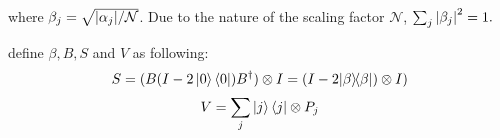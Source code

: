 \documentclass{article}
\def\kb#1#2{| #1 \rangle\!\langle #2 |}
\begin{document}
where $\beta_j = \sqrt{\abs{\alpha_j}/\mathcal{N}}$. Due to the nature of the scaling factor $\mathcal{N}$, $\sum_j \abs{\beta_j}^2 = 1.$

\textcite{poulin} define $\beta, B, S$ and  $V$ as following:
\[ S = (B (I - 2 \ket{0}\bra{0}) B^{\dagger}) \otimes I= (I-2\kb \beta \beta) \otimes I) \]
\[ V=\sum_{j}\ket{j}\bra{j} \otimes P_{j} \]



\printbibliography
\end{document}

